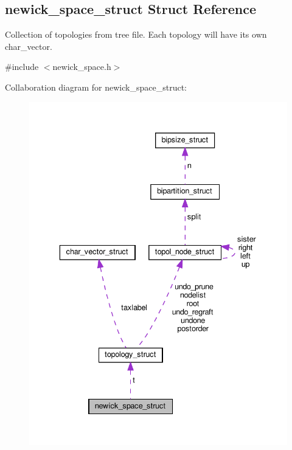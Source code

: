 \hypertarget{structnewick__space__struct}{}\subsection{newick\+\_\+space\+\_\+struct Struct Reference}
\label{structnewick__space__struct}


Collection of topologies from tree file. Each topology will have its own char\+\_\+vector.  




{\ttfamily \#include $<$newick\+\_\+space.\+h$>$}



Collaboration diagram for newick\+\_\+space\+\_\+struct\+:\nopagebreak
\begin{figure}[H]
\begin{center}
\leavevmode
\includegraphics[width=336pt]{structnewick__space__struct__coll__graph}
\end{center}
\end{figure}
